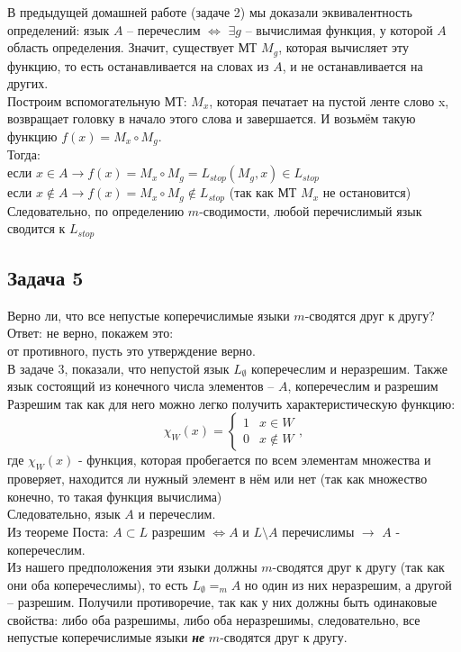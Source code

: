 \documentclass[a4paper,12pt]{article} %
\begin{document}
В предыдущей домашней работе (задаче 2) мы доказали эквивалентность определений: язык $ A $ -- перечеслим $ \Longleftrightarrow $ $ \exists g $ -- вычислимая функция, у которой $ A $ область определения. Значит, существует МТ $ M_g $, которая вычисляет эту функцию, то есть останавливается на словах из $ A $, и не останавливается на других.\\
Построим вспомогательную МТ: $ M_x $, которая печатает на пустой ленте слово x, возвращает головку в начало этого слова и завершается. И возьмём такую функцию $ f(x) = M_x \circ M_g $. \\Тогда:\\
если $ x\in A \longrightarrow f(x) = M_x \circ M_g = L_{stop}(M_g,x) \in L_{stop} $\\
если $ x\notin A \longrightarrow f(x) = M_x \circ M_g \notin L_{stop} $ (так как МТ $ M_x $ не остановится)\\
Следовательно, по определению $m$-сводимости, любой перечислимый язык сводится к $ L_{stop} $

\subsection*{Задача 5}
Верно ли, что все непустые коперечислимые языки $m$-сводятся друг к другу?\\
Ответ: не верно, покажем это:\\
от противного, пусть это утверждение верно.\\
В задаче 3, показали, что непустой язык $L_\emptyset$ коперечеслим и неразрешим. Также язык состоящий из конечного числа элементов -- $A$,  коперечеслим и разрешим\\
Разрешим так как для него можно легко получить характеристическую функцию:
\[
\chi_{W}(x) = \left\{
\begin{array}{cc}
1 & x \in W \\
0 & x \not \in W 
\end{array} \right., 
\]
где $\chi_{W}(x)$ - функция, которая пробегается по всем элементам множества и проверяет, находится ли нужный элемент в нём или нет (так как множество конечно, то такая функция вычислима)\\
Следовательно, язык $A$ и перечеслим.\\
Из теореме Поста:  $A \subset L$ разрешим $\iff A$ и $L \setminus A$ перечислимы $\longrightarrow$ $A$ - коперечеслим.\\
Из нашего предположения эти языки должны $m$-сводятся друг к другу (так как они оба коперечеслимы), то есть 
$L_\emptyset =_m A$
но один из них неразрешим, а другой -- разрешим. Получили противоречие, так как у них должны быть одинаковые свойства: либо оба разрешимы, либо оба неразрешимы, следовательно, все непустые коперечислимые языки \textbf{\textit{не}} $m$-сводятся друг к другу.
\end{document}

